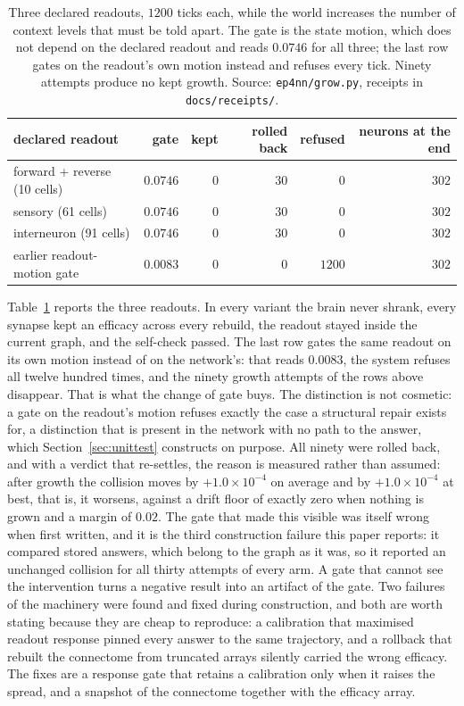 \documentclass[11pt]{article}
\theoremstyle{remark}
\begin{document}
\begin{table}[t]
\centering
\small
\caption{Three declared readouts, $1200$ ticks each, while the world increases the number of context
levels that must be told apart. The gate is the state motion, which does not depend on the declared
readout and reads $0.0746$ for all three; the last row gates on the readout's own motion instead and
refuses every tick. Ninety attempts produce no kept growth. Source: \texttt{ep4nn/grow.py},
receipts in \texttt{docs/receipts/}.}
\label{tab:growth}
\begin{tabular}{@{}lrrrrr@{}}
\toprule
declared readout & gate & kept & rolled back & refused & neurons at the end \\
\midrule
forward + reverse (10 cells) & $0.0746$ & $0$ & $30$ & $0$ & $302$ \\
sensory (61 cells) & $0.0746$ & $0$ & $30$ & $0$ & $302$ \\
interneuron (91 cells) & $0.0746$ & $0$ & $30$ & $0$ & $302$ \\
\midrule
earlier readout-motion gate & $0.0083$ & $0$ & $0$ & $1200$ & $302$ \\
\bottomrule
\end{tabular}
\end{table}

Table~\ref{tab:growth} reports the three readouts. In every variant the brain never shrank, every
synapse kept an efficacy across every rebuild, the readout stayed inside the current graph, and the
self-check passed. The last row gates the same readout on its own motion instead of
on the network's: that reads $0.0083$, the system refuses all twelve hundred times, and the ninety
growth attempts of the rows above disappear. That is what the change of gate buys. The distinction is
not cosmetic: a gate on the readout's motion refuses exactly the case a structural repair exists for,
a distinction that is present in the network with no path to the answer, which
Section~\ref{sec:unittest} constructs on purpose. All ninety were rolled back, and with a verdict that re-settles, the reason is measured rather than
assumed: after growth the collision moves by $+1.0\times10^{-4}$ on average and by $+1.0\times10^{-4}$
at best, that is, it worsens, against a drift floor of exactly zero when nothing is grown and a margin
of $0.02$. The gate that made this visible was itself wrong when first written, and it is the third
construction failure this paper reports: it compared stored answers, which belong to the graph as it
was, so it reported an unchanged collision for all thirty attempts of every arm. A gate that cannot
see the intervention turns a negative result into an artifact of the gate. Two failures of the machinery were found and
fixed during construction, and both are worth stating because they are cheap to reproduce: a
calibration that maximised readout response pinned every answer to the same trajectory, and a
rollback that rebuilt the connectome from truncated arrays silently carried the wrong efficacy. The
fixes are a response gate that retains a calibration only when it raises the spread, and a snapshot
of the connectome together with the efficacy array.
\end{document}
